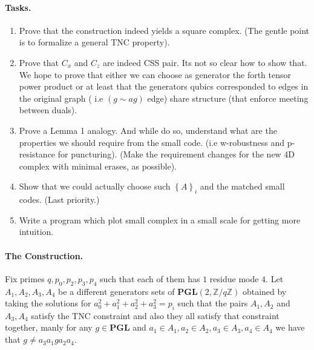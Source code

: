 \documentclass{article}
\begin{document}
\begin{multicols*}{2}
\paragraph{Tasks.}
	\begin{enumerate}
	  \item Prove that the construction indeed yields a square complex. (The gentle point is to formalize a general TNC property).  
	  \item Prove that $C_{x}$ and $C_{z}$ are indeed CSS pair. Its not so clear how to show that. We hope to prove that either we can choose as generator the forth tensor power product or at least that the generators qubics corresponded to edges in the original graph ( i.e $ \left( g \sim ag  \right) $ edge) share structure (that enforce meeting between duals).
	  \item Prove a Lemma 1 analogy. And while do so, understand what are the properties we should require from the small code.  
	    (i.e w-robustness and p-resistance for puncturing). 
	    (Make the requirement changes for the new 4D complex with minimal erases, as possible).
	  \item Show that we could actually choose such $\left\{ A \right\}_{i}$ and the matched small codes. (Last priority.) 
	  \item Write a program which plot small complex in a small scale for getting more intuition.  
	\end{enumerate}
 \paragraph{The Construction.} Fix primes $q,p_0,p_2,p_3,p_4$ such that each of them has $1 $ residue mode $4$. Let $A_{1},A_{2},A_{3},A_{4}$ be a different generators sets of $ \mathbf{PGL}(2 , \mathbb{Z} / q\mathbb{Z} )  $ 
  obtained by taking the solutions for $a_{0}^{2} + a_{1}^{2} +a_{2}^{2} +a_{3}^{2} = p_i $ such that the pairs $A_{1},A_{2}$ and $A_{3},A_{4}$ satisfy the 
  TNC constraint and also they all satisfy that constraint together, manly for any $g \in \mathbf{PGL}$  and $a_{1}\in A_{1}, a_{2} \in A_{2}, a_{3} \in A_{3}, a_{4} \in A_{4}$ we have that $ g \neq a_{3}a_{1}ga_{2}a_{4}$. 
  

\end{multicols*}
\end{document}
